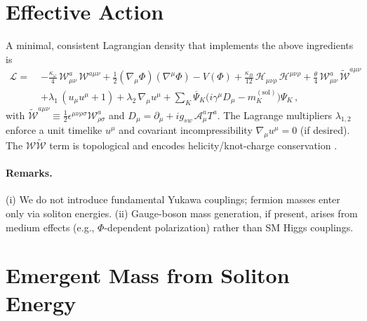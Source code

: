 \documentclass[12pt]{article}
\begin{document}
    \section{Effective Action}

    A minimal, consistent Lagrangian density that implements the above ingredients is
    \begin{align}
        \mathcal{L} =\;& -\frac{\kappa_\omega}{4}\, \mathcal{W}^a_{\mu\nu}\,\mathcal{W}^{a\mu\nu}
        + \frac{1}{2} (\nabla_\mu \Phi)(\nabla^\mu \Phi) - V(\Phi)
        + \frac{\kappa_B}{12}\, \mathcal{H}_{\mu\nu\rho}\,\mathcal{H}^{\mu\nu\rho}
        + \frac{\theta}{4}\, \mathcal{W}^a_{\mu\nu}\,\tilde{\mathcal{W}}^{a\mu\nu} \\
        &+ \lambda_1\,(u_\mu u^\mu + 1) + \lambda_2\, \nabla_\mu u^\mu
        + \sum_K \overline{\Psi}_K\big(i\gamma^\mu D_\mu - m_K^{(\mathrm{sol})}\big)\Psi_K\,,
        \label{eq:EFT}
    \end{align}
    with $\tilde{\mathcal{W}}^{a\mu\nu} \equiv \tfrac{1}{2} \epsilon^{\mu\nu\rho\sigma} \mathcal{W}^a_{\rho\sigma}$ and $D_\mu = \partial_\mu + i g_{\!sw}\,\mathcal{A}_\mu^a T^a$. The Lagrange multipliers $\lambda_{1,2}$ enforce a unit timelike $u^\mu$ and covariant incompressibility $\nabla_\mu u^\mu=0$ (if desired). The $\mathcal{W}\tilde{\mathcal{W}}$ term is topological and encodes helicity/knot-charge conservation \cite{Moffatt1969,Arnold1998}.

    \paragraph{Remarks.} (i) We do not introduce fundamental Yukawa couplings; fermion masses enter only via soliton energies. (ii) Gauge-boson mass generation, if present, arises from medium effects (e.g., $\Phi$-dependent polarization) rather than SM Higgs couplings.

    \section{Emergent Mass from Soliton Energy}
\end{document}
